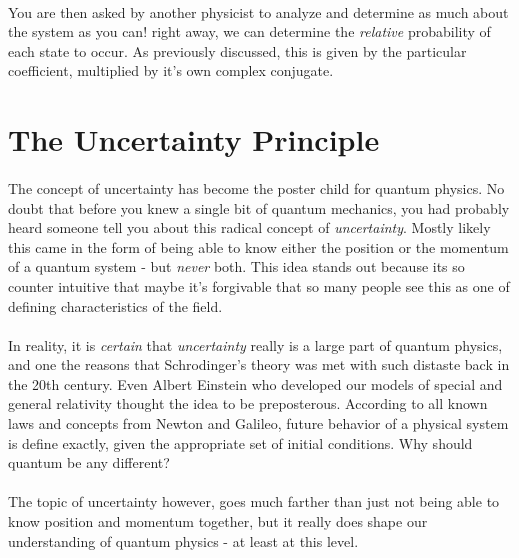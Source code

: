 \documentclass[12pt,letterpaper]{book}
\begin{document}
\paragraph*{}You are then asked by another physicist to analyze and determine as much about the system as you can! right away, we can determine the \textit{relative} probability of each state to occur. As previously discussed, this is given by the particular coefficient, multiplied by it's own complex conjugate.




\section{The Uncertainty Principle}

\paragraph*{}The concept of uncertainty has become the poster child for quantum physics. No doubt that before you knew a single bit of quantum mechanics, you had probably heard someone tell you about this radical concept of \textit{uncertainty}. Mostly likely this came in the form of being able to know either the position or the momentum of a quantum system - but \textit{never} both. This idea stands out because its so counter intuitive that maybe it's forgivable that so many people see this as one of defining characteristics of the field.

\paragraph*{}In reality, it is \textit{certain} that \textit{uncertainty} really is a large part of quantum physics, and one the reasons that Schrodinger's theory was met with such distaste back in the 20th century. Even Albert Einstein who developed our models of special and general relativity thought the idea to be preposterous. According to all known laws and concepts from Newton and Galileo, future behavior of a physical system is define exactly, given the appropriate set of initial conditions. Why should quantum be any different?

\paragraph*{}The topic of uncertainty however, goes much farther than just not being able to know position and momentum together, but it really does shape our understanding of quantum physics - at least at this level.
\end{document}
